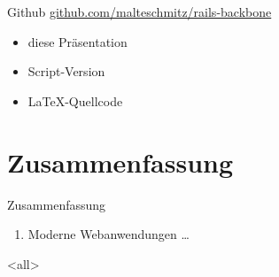\newcommand{\authorstring}{Malte Schmitz, Johannes Thorn}
\newcommand{\shortauthorstring}{Malte, Johannes}
\newcommand{\titlestring}{Moderne Webanwendungen\\ mit Rails und Backbone.js}
\newcommand{\shorttitlestring}{Rails \&\only<presentation>{\\} Backbone}
\newcommand{\datestring}{MetaNook 2012}
\newcommand{\titleimage}{\pgfimage[height=12mm]{images/rails}{\huge\bfseries\raisebox{12pt}{\ \&\ }}\pgfimage[height=13mm]{images/backbone}}



\displaytitle


\begin{frame}{Github}
  \url{github.com/malteschmitz/rails-backbone}
  \begin{itemize}
    \item diese Präsentation
    \item Script-Version
    \item \LaTeX-Quellcode
  \end{itemize}
\end{frame}





\section*{Zusammenfassung}

\begin{frame}{Zusammenfassung}
  \begin{enumerate}
    \item Moderne Webanwendungen \ldots
  \end{enumerate}
\end{frame}

\mode
<all>


